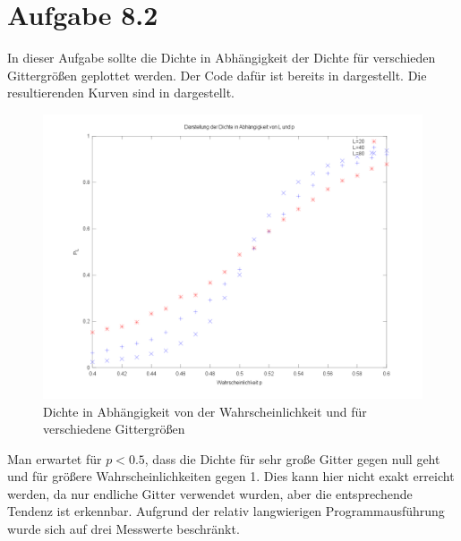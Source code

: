 \section*{Aufgabe 8.2}
In dieser Aufgabe sollte die Dichte in Abhängigkeit der Dichte für verschieden Gittergrößen
geplottet werden. Der Code dafür ist bereits in  dargestellt. Die
resultierenden Kurven sind in  dargestellt.

\begin{figure}[htb]
  \centering
  \includegraphics[width=0.8\columnwidth,keepaspectratio]{../tmp/zweitens.png}
  \caption{Dichte in Abhängigkeit von der Wahrscheinlichkeit und für verschiedene Gittergrößen}
  \label{fig:dichte}
\end{figure}

Man erwartet für $p<0.5$, dass die Dichte für sehr große Gitter gegen null geht 
und für größere Wahrscheinlichkeiten gegen 1. Dies kann hier nicht exakt erreicht werden,
da nur endliche Gitter verwendet wurden, aber die entsprechende Tendenz ist erkennbar.
Aufgrund der relativ langwierigen Programmausführung wurde sich auf drei Messwerte beschränkt.